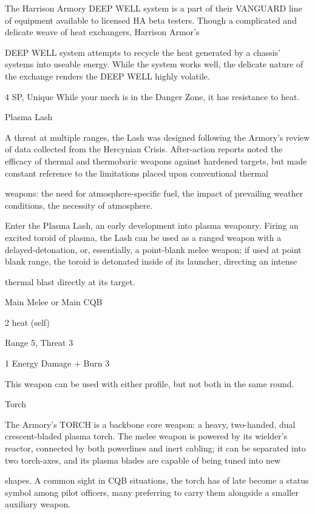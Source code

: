 The Harrison Armory DEEP WELL system is a part of their VANGUARD line of equipment available to
licensed HA beta testers. Though a complicated and delicate weave of heat exchangers, Harrison Armor’s

DEEP WELL system attempts to recycle the heat generated by a chassis’ systems into useable energy.
While the system works well, the delicate nature of the exchange renders the DEEP WELL highly volatile.

4 SP, Unique
While your mech is in the Danger Zone, it has resistance to heat.


Plasma Lash

A threat at multiple ranges, the Lash was designed following the Armory’s review of data collected from the
Hercynian Crisis. After-action reports noted the efficacy of thermal and thermobaric weapons against
hardened targets, but made constant reference to the limitations placed upon conventional thermal

weapons: the need for atmosphere-specific fuel, the impact of prevailing weather conditions, the necessity
of atmosphere.

Enter the Plasma Lash, an early development into plasma weaponry. Firing an excited toroid of plasma, the
Lash can be used as a ranged weapon with a delayed-detonation, or, essentially, a point-blank melee
weapon; if used at point blank range, the toroid is detonated inside of its launcher, directing an intense

thermal blast directly at its target.

Main Melee or Main CQB

2 heat (self)

Range 5, Threat 3

1 Energy Damage + Burn 3





This weapon can be used with either profile, but not both in the same round.


Torch

The Armory’s TORCH is a backbone core weapon: a heavy, two-handed, dual crescent-bladed plasma
torch. The melee weapon is powered by its wielder’s reactor, connected by both powerlines and inert
cabling; it can be separated into two torch-axes, and its plasma blades are capable of being tuned into new

shapes. A common sight in CQB situations, the torch has of late become a status symbol among pilot
officers, many preferring to carry them alongside a smaller auxiliary weapon.

